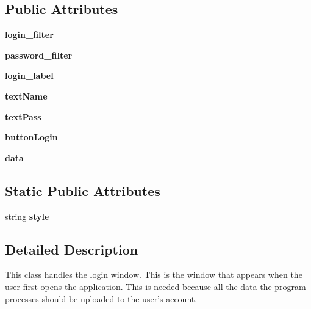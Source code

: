 \subsection*{Public Attributes}
\begin{DoxyCompactItemize}
\item 
\mbox{\label{classLogin_1_1LoginWindow_af399a91c1b7b6375a1b01def88da385e}} 
{\bfseries login\+\_\+filter}
\item 
\mbox{\label{classLogin_1_1LoginWindow_aa87869ad002d2120d438e91df3a954e0}} 
{\bfseries password\+\_\+filter}
\item 
\mbox{\label{classLogin_1_1LoginWindow_a53dacafcf67eda9debcab4e1377c99a9}} 
{\bfseries login\+\_\+label}
\item 
\mbox{\label{classLogin_1_1LoginWindow_aff1354ca874c366e8ca8ba4c9af1574f}} 
{\bfseries text\+Name}
\item 
\mbox{\label{classLogin_1_1LoginWindow_afa642ee1b28a5eab79994873513a3a2f}} 
{\bfseries text\+Pass}
\item 
\mbox{\label{classLogin_1_1LoginWindow_a496b8df8778cf173a80583fb29f6cb83}} 
{\bfseries button\+Login}
\item 
\mbox{\label{classLogin_1_1LoginWindow_a9db82f6715afbc939356324d5b0a3d24}} 
{\bfseries data}
\end{DoxyCompactItemize}
\subsection*{Static Public Attributes}
\begin{DoxyCompactItemize}
\item 
string {\bfseries style}
\end{DoxyCompactItemize}


\subsection{Detailed Description}
\begin{DoxyVerb}This class handles the login window. This is the window that appears
when the user first opens the application. This is needed because all the data
the program processes should be uploaded to the user's account.
\end{DoxyVerb}
 

